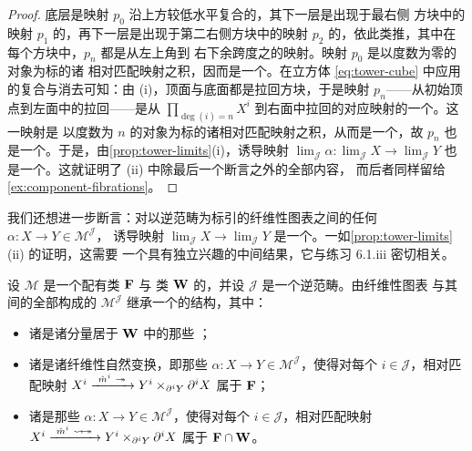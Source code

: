 \begin{proof}
底层是映射 $p_0$ 沿上方较低水平复合的\trPullback，其下一层是出现于最右侧
方块中的映射 $p_1$ 的\trPullback，再下一层是出现于第二右侧方块中的映射
$p_2$ 的\trPullback，依此类推，其中在每个方块中，$p_n$ 都是从左上角到
右下余跨度之\trPullback{}的映射。映射 $p_0$ 是以度数为零的对象为标的诸
相对匹配映射之积，因而是一个\trFibration。在立方体 \eqref{eq:tower-cube}
中应用\trPullback{}的复合与消去可知：由 (i)，顶面与底面都是拉回方块，于是映射
$p_n$——从初始顶点到左面中的拉回——是从
$\prod_{\deg(i)=n}X^i$ 到右面中拉回的对应映射的一个\trPullback。这一映射是
以度数为 $n$ 的对象为标的诸相对匹配映射之积，从而是一个\trFibration，故
$p_n$ 也是一个\trFibration。于是，由\cref{prop:tower-limits}(i)，诱导映射
$\operatorname{lim}_{\mathcal{J}}\alpha\colon\operatorname{lim}_{\mathcal{J}}X\to\operatorname{lim}_{\mathcal{J}}Y$
也是一个\trFibration。这就证明了 (ii) 中除最后一个断言之外的全部内容，
而后者同样留给\cref{ex:component-fibrations}。
\end{proof}

我们还想进一步断言：对以逆范畴为标引的纤维性图表之间的任何%
\trPointwise{}\trWeakEquivalence{} $\alpha\colon X\to Y\in\mathcal{M}^{\mathcal{J}}$，
诱导映射 $\operatorname{lim}_{\mathcal{J}}X\to\operatorname{lim}_{\mathcal{J}}Y$
是一个\trWeakEquivalence。一如\cref{prop:tower-limits}(ii) 的证明，这需要
一个具有独立兴趣的中间结果，它与练习 6.1.iii 密切相关。

\begin{proposition}\label{prop:fibrant-diagram-cfo}
设 $\mathcal{M}$ 是一个配有\trFibration{}类 $\mathbf{F}$ 与\trWeakEquivalence{}%
类 $\mathbf{W}$ 的\trCategoryOfFibrantObjects，并设 $\mathcal{J}$ 是一个逆范畴。由纤维性图表
与其间的全部\trNaturalTransformation{}构成的\trCategory{}
$\mathcal{M}^{\mathcal{J}}$ 继承一个\trCategoryOfFibrantObjects{}的结构，其中：
\begin{itemize}
\item 诸\trWeakEquivalence{}是诸分量居于 $\mathbf{W}$ 中的那些%
  \trNaturalTransformation{}；
\item 诸\trFibration{}是诸纤维性自然变换，即那些
  $\alpha\colon X\to Y\in\mathcal{M}^{\mathcal{J}}$，使得对每个
  $i\in\mathcal{J}$，相对匹配映射
  $X^i\xrightarrow{\ \hat{m}^i\ \rvFarrow\ }Y^i\times_{\partial^i Y}\partial^i X$
  属于 $\mathbf{F}$；
\item 诸\trTrivialFibration{}是那些
  $\alpha\colon X\to Y\in\mathcal{M}^{\mathcal{J}}$，使得对每个
  $i\in\mathcal{J}$，相对匹配映射
  $X^i\xrightarrow{\ \hat{m}^i\ \rvTFarrow\ }Y^i\times_{\partial^i Y}\partial^i X$
  属于 $\mathbf{F}\cap\mathbf{W}$。
\end{itemize}
\end{proposition}

